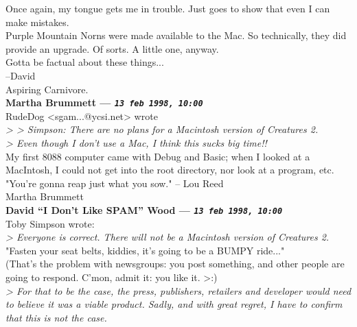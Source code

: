 \documentclass[11pt,twoside,a4paper]{article}
\begin{document}
\begin{multicols*}{2}
Once again, my tongue gets me in trouble. Just goes to show that even I can make mistakes.~\\

Purple Mountain Norns were made available to the Mac. So technically, they did provide an upgrade. Of sorts. A little one, anyway.~\\

Gotta be factual about these things...~\\

--David~\\
Aspiring Carnivore.~\\

 
		
	
		
\textbf{Martha Brummett --- \emph{\texttt{13 feb 1998, 10:00}}}~\\

RudeDog <sgam...@ycsi.net> wrote~\\
\emph{> > Simpson: There are no plans for a Macintosh version of Creatures 2.}~\\
\emph{> Even though I don't use a Mac, I think this sucks big time!!}~\\

My first 8088 computer came with Debug and Basic; when I looked at a MacIntosh, I could not get into the root directory, nor look at a program, etc.~\\

"You're gonna reap just what you sow." -- Lou Reed~\\

Martha Brummett~\\

 
		
	
		
\textbf{David ``I Don't Like SPAM'' Wood --- \emph{\texttt{13 feb 1998, 10:00}}}~\\

Toby Simpson wrote:~\\
\emph{> Everyone is correct. There will not be a Macintosh version of Creatures 2.}~\\

"Fasten your seat belts, kiddies, it's going to be a BUMPY ride..."~\\

(That's the problem with newsgroups: you post something, and other people are going to respond. C'mon, admit it: you like it. >:)~\\

\emph{> For that to be the case, the press, publishers, retailers and developer would need to believe it was a viable product. Sadly, and with great regret, I have to confirm that this is not the case.}~\\


\end{multicols*}
\end{document}
